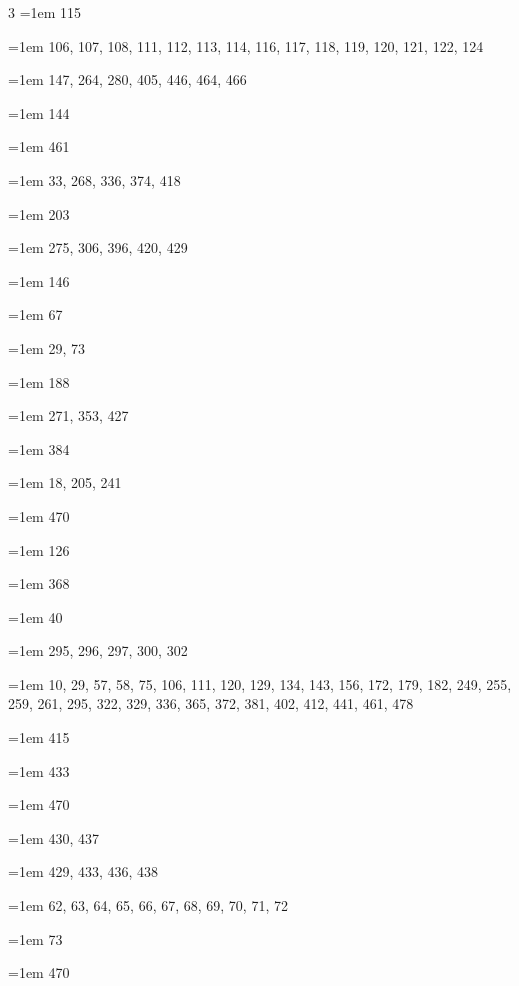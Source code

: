 \begin{multicols}{3}
\hangindent=1em  115\par
\hangindent=1em  106, 107, 108, 111, 112, 113, 114, 116, 117, 118, 119, 120, 121, 122, 124\par
\hangindent=1em  147, 264, 280, 405, 446, 464, 466\par
\hangindent=1em  144\par
\hangindent=1em  461\par
\hangindent=1em  33, 268, 336, 374, 418\par
\hangindent=1em  203\par
\hangindent=1em  275, 306, 396, 420, 429\par
\hangindent=1em  146\par
\hangindent=1em  67\par
\hangindent=1em  29, 73\par
\hangindent=1em  188\par
\hangindent=1em  271, 353, 427\par
\hangindent=1em  384\par
\hangindent=1em  18, 205, 241\par
\hangindent=1em  470\par
\hangindent=1em  126\par
\hangindent=1em  368\par
\hangindent=1em  40\par
\hangindent=1em  295, 296, 297, 300, 302\par
\hangindent=1em  10, 29, 57, 58, 75, 106, 111, 120, 129, 134, 143, 156, 172, 179, 182, 249, 255, 259, 261, 295, 322, 329, 336, 365, 372, 381, 402, 412, 441, 461, 478\par
\hangindent=1em  415\par
\hangindent=1em  433\par
\hangindent=1em  470\par
\hangindent=1em  430, 437\par
\hangindent=1em  429, 433, 436, 438\par
\hangindent=1em  62, 63, 64, 65, 66, 67, 68, 69, 70, 71, 72\par
\hangindent=1em  73\par
\hangindent=1em  470\par

\end{multicols}
